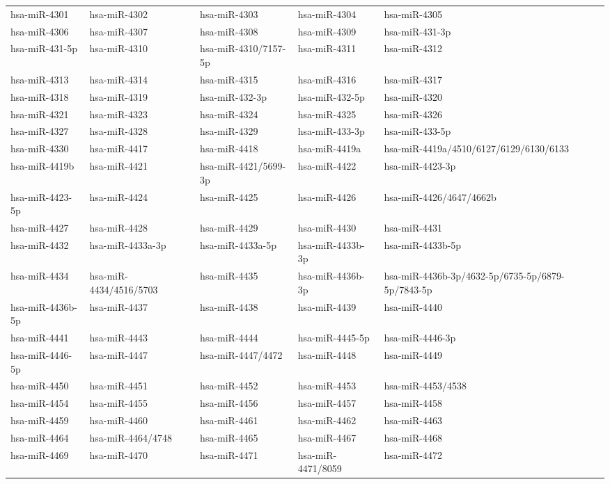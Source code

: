 \begin{longtable}{lllll}
hsa-miR-4301 & hsa-miR-4302 & hsa-miR-4303 & hsa-miR-4304 & hsa-miR-4305 \\
hsa-miR-4306 & hsa-miR-4307 & hsa-miR-4308 & hsa-miR-4309 & hsa-miR-431-3p \\
hsa-miR-431-5p & hsa-miR-4310 & hsa-miR-4310/7157-5p & hsa-miR-4311 & hsa-miR-4312 \\
hsa-miR-4313 & hsa-miR-4314 & hsa-miR-4315 & hsa-miR-4316 & hsa-miR-4317 \\
hsa-miR-4318 & hsa-miR-4319 & hsa-miR-432-3p & hsa-miR-432-5p & hsa-miR-4320 \\
hsa-miR-4321 & hsa-miR-4323 & hsa-miR-4324 & hsa-miR-4325 & hsa-miR-4326 \\
hsa-miR-4327 & hsa-miR-4328 & hsa-miR-4329 & hsa-miR-433-3p & hsa-miR-433-5p \\
hsa-miR-4330 & hsa-miR-4417 & hsa-miR-4418 & hsa-miR-4419a & hsa-miR-4419a/4510/6127/6129/6130/6133 \\
hsa-miR-4419b & hsa-miR-4421 & hsa-miR-4421/5699-3p & hsa-miR-4422 & hsa-miR-4423-3p \\
hsa-miR-4423-5p & hsa-miR-4424 & hsa-miR-4425 & hsa-miR-4426 & hsa-miR-4426/4647/4662b \\
hsa-miR-4427 & hsa-miR-4428 & hsa-miR-4429 & hsa-miR-4430 & hsa-miR-4431 \\
hsa-miR-4432 & hsa-miR-4433a-3p & hsa-miR-4433a-5p & hsa-miR-4433b-3p & hsa-miR-4433b-5p \\
hsa-miR-4434 & hsa-miR-4434/4516/5703 & hsa-miR-4435 & hsa-miR-4436b-3p & hsa-miR-4436b-3p/4632-5p/6735-5p/6879-5p/7843-5p \\
hsa-miR-4436b-5p & hsa-miR-4437 & hsa-miR-4438 & hsa-miR-4439 & hsa-miR-4440 \\
hsa-miR-4441 & hsa-miR-4443 & hsa-miR-4444 & hsa-miR-4445-5p & hsa-miR-4446-3p \\
hsa-miR-4446-5p & hsa-miR-4447 & hsa-miR-4447/4472 & hsa-miR-4448 & hsa-miR-4449 \\
hsa-miR-4450 & hsa-miR-4451 & hsa-miR-4452 & hsa-miR-4453 & hsa-miR-4453/4538 \\
hsa-miR-4454 & hsa-miR-4455 & hsa-miR-4456 & hsa-miR-4457 & hsa-miR-4458 \\
hsa-miR-4459 & hsa-miR-4460 & hsa-miR-4461 & hsa-miR-4462 & hsa-miR-4463 \\
hsa-miR-4464 & hsa-miR-4464/4748 & hsa-miR-4465 & hsa-miR-4467 & hsa-miR-4468 \\
hsa-miR-4469 & hsa-miR-4470 & hsa-miR-4471 & hsa-miR-4471/8059 & hsa-miR-4472 \\

\end{longtable}
